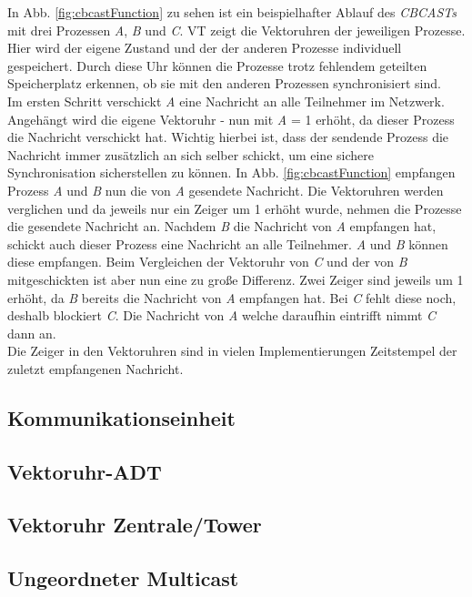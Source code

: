 In Abb. \ref{fig:cbcastFunction} zu sehen ist ein beispielhafter Ablauf des \textit{CBCASTs} mit drei Prozessen \textit{A}, \textit{B} und \textit{C}. VT zeigt die Vektoruhren der jeweiligen Prozesse. Hier wird der eigene Zustand und der der anderen Prozesse individuell gespeichert. Durch diese Uhr können die Prozesse trotz fehlendem geteilten Speicherplatz erkennen, ob sie mit den anderen Prozessen synchronisiert sind.\\
Im ersten Schritt verschickt \textit{A} eine Nachricht an alle Teilnehmer im Netzwerk. Angehängt wird die eigene Vektoruhr - nun mit \textit{A} = 1 erhöht, da dieser Prozess die Nachricht verschickt hat. Wichtig hierbei ist, dass der sendende Prozess die Nachricht immer zusätzlich an sich selber schickt, um eine sichere Synchronisation sicherstellen zu können. In Abb. \ref{fig:cbcastFunction} empfangen Prozess \textit{A} und \textit{B} nun die von \textit{A} gesendete Nachricht. Die Vektoruhren werden verglichen und da jeweils nur ein Zeiger um 1 erhöht wurde, nehmen die Prozesse die gesendete Nachricht an. Nachdem \textit{B} die Nachricht von \textit{A} empfangen hat, schickt auch dieser Prozess eine Nachricht an alle Teilnehmer. \textit{A} und \textit{B} können diese empfangen. Beim Vergleichen der Vektoruhr von \textit{C} und der von \textit{B} mitgeschickten ist aber nun eine zu große Differenz. Zwei Zeiger sind jeweils um 1 erhöht, da \textit{B} bereits die Nachricht von \textit{A} empfangen hat. Bei \textit{C} fehlt diese noch, deshalb blockiert \textit{C}. Die Nachricht von \textit{A} welche daraufhin eintrifft nimmt \textit{C} dann an.\\
Die Zeiger in den Vektoruhren sind in vielen Implementierungen Zeitstempel der zuletzt empfangenen Nachricht.

\subsection{Kommunikationseinheit}

\subsection{Vektoruhr-ADT}

\subsection{Vektoruhr Zentrale/Tower}

\subsection{Ungeordneter Multicast}

